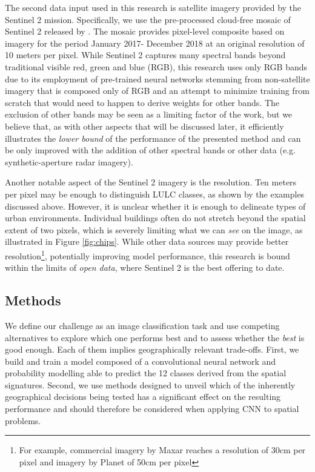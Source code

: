
The second data input used in this research is satellite imagery provided by the
Sentinel 2 mission. Specifically, we use the pre-processed cloud-free mosaic of Sentinel
2 released by \cite{CORBANE2020105737}.
The mosaic provides pixel-level composite based on imagery for the period January 2017-
December 2018 at an original resolution of 10 meters per pixel. While Sentinel 2
captures many spectral bands beyond traditional visible red, green and blue (RGB), this
research uses only RGB bands due to its employment of pre-trained neural networks
stemming from non-satellite imagery that is composed only of RGB and an attempt to
minimize training from scratch that would need to happen to derive weights for other bands. The exclusion of other
bands may be seen as a limiting factor of the work, but we believe that, as with other
aspects that will be discussed later, it efficiently illustrates the \textit{lower
bound} of the performance of the presented method and can be only improved with the addition of
other spectral bands or other data (e.g. synthetic-aperture radar imagery).

Another notable aspect of the Sentinel 2 imagery is the resolution. Ten meters per pixel
may be enough to distinguish LULC classes, as shown by the examples discussed
above. However, it is unclear whether it is enough to delineate types of urban
environments. Individual buildings often do not stretch beyond the spatial extent of two
pixels, which is severely limiting what we can \textit{see} on the image, as illustrated
in Figure \ref{fig:chips}. While other data sources may provide better
resolution\footnote{For example, commercial imagery by Maxar reaches a resolution of
30cm per pixel and imagery by Planet of 50cm per pixel}, potentially improving model
performance, this research is bound within the limits of \textit{open data}, where
Sentinel 2 is the best offering to date.


\subsection{Methods}


We define our challenge as an image classification task and use competing alternatives
to explore which one performs best and to assess whether the \textit{best} is good enough.
Each of them implies geographically relevant
trade-offs. First, we build and train a model composed of a convolutional neural network
and probability modelling able to predict the 12 classes derived from the spatial
signatures. Second, we use methods designed to unveil which of the inherently
geographical decisions being tested has a significant effect on the resulting
performance and should therefore be considered when applying CNN to spatial
problems.

